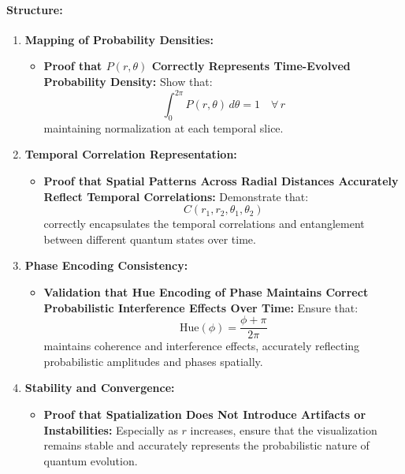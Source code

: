 \documentclass[12pt]{article}
\begin{document}
\paragraph{Structure:}
\begin{enumerate}
    \item \textbf{Mapping of Probability Densities:}
    \begin{itemize}
        \item \textbf{Proof that \(P(r, \theta)\) Correctly Represents Time-Evolved Probability Density:}
        Show that:
        \[
        \int_{0}^{2\pi} P(r, \theta) \, d\theta = 1 \quad \forall \, r
        \]
        maintaining normalization at each temporal slice.
    \end{itemize}
    
    \item \textbf{Temporal Correlation Representation:}
    \begin{itemize}
        \item \textbf{Proof that Spatial Patterns Across Radial Distances Accurately Reflect Temporal Correlations:}
        Demonstrate that:
        \[
        C(r_1, r_2, \theta_1, \theta_2)
        \]
        correctly encapsulates the temporal correlations and entanglement between different quantum states over time.
    \end{itemize}
    
    \item \textbf{Phase Encoding Consistency:}
    \begin{itemize}
        \item \textbf{Validation that Hue Encoding of Phase Maintains Correct Probabilistic Interference Effects Over Time:}
        Ensure that:
        \[
        \text{Hue}(\phi) = \dfrac{\phi + \pi}{2\pi}
        \]
        maintains coherence and interference effects, accurately reflecting probabilistic amplitudes and phases spatially.
    \end{itemize}
    
    \item \textbf{Stability and Convergence:}
    \begin{itemize}
        \item \textbf{Proof that Spatialization Does Not Introduce Artifacts or Instabilities:}
        Especially as \(r\) increases, ensure that the visualization remains stable and accurately represents the probabilistic nature of quantum evolution.
    \end{itemize}
    

\end{enumerate}
\end{document}
